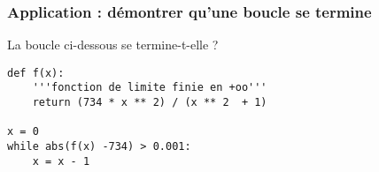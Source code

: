 \documentclass[xcolor=svgnames,t,final]{beamer}
\begin{document}
\begin{frame}[fragile]
\frametitle{Application  : démontrer qu'une boucle se termine}
 
 \begin{alertblock}{}
La boucle ci-dessous se termine-t-elle ?

\begin{lstlisting}[style=rond]
def f(x):
	'''fonction de limite finie en +oo'''
	return (734 * x ** 2) / (x ** 2  + 1)
	
x = 0
while abs(f(x) -734) > 0.001:
	x = x - 1
\end{lstlisting}

\end{alertblock}

\end{frame}
\end{document}
